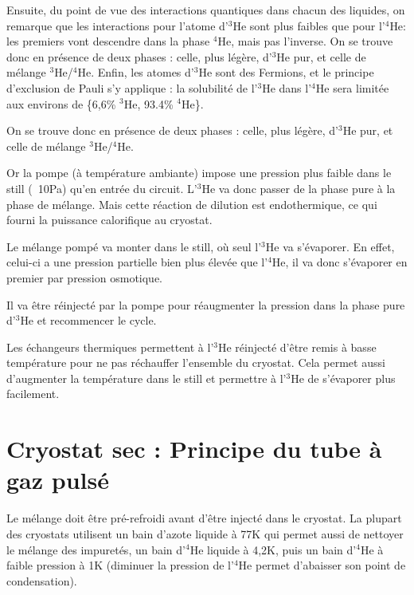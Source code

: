\documentclass[a4paper,11pt]{report}
\newcommand{\HeT}{$^3$He\xspace}
\newcommand{\HeQ}{$^4$He\xspace}
\begin{document}
Ensuite, du point de vue des interactions quantiques dans chacun des liquides, on remarque que les interactions pour l'atome d'\HeT sont plus faibles que pour l'\HeQ : les premiers vont descendre dans la phase \HeQ, mais pas l'inverse.
\newline
On se trouve donc en présence de deux phases : celle, plus légère, d'\HeT pur, et celle de mélange \HeT/\HeQ.
Enfin, les atomes d'\HeT sont des Fermions, et le principe d'exclusion de Pauli s'y applique : la solubilité de l'\HeT dans l'\HeQ sera limitée aux environs de \{6,6\% \HeT, 93.4\% \HeQ\}.
\newline

On se trouve donc en présence de deux phases : celle, plus légère, d'\HeT pur, et celle de mélange \HeT/\HeQ.
\newline

Or la pompe (à température ambiante) impose une pression plus faible dans le still (~10Pa) qu'en entrée du circuit. L'\HeT va donc passer de la phase pure à la phase de mélange. Mais cette réaction de dilution est endothermique, ce qui fourni la puissance calorifique au cryostat.

Le mélange pompé va monter dans le still, où seul l'\HeT va s'évaporer. En effet, celui-ci a une pression partielle bien plus élevée que l'\HeQ, il va donc s'évaporer en premier par pression osmotique.

Il va être réinjecté par la pompe pour réaugmenter la pression dans la phase pure d'\HeT et recommencer le cycle.
\newline

Les échangeurs thermiques permettent à l'\HeT réinjecté d'être remis à basse température pour ne pas réchauffer l'ensemble du cryostat. Cela permet aussi d'augmenter la température dans le still et permettre à l'\HeT de s'évaporer plus facilement.

\section{Cryostat sec : Principe du tube à gaz pulsé}
Le mélange doit être pré-refroidi avant d'être injecté dans le cryostat.\newline
La plupart des cryostats utilisent un bain d'azote liquide à 77K qui permet aussi de nettoyer le mélange des impuretés, un bain d'\HeQ liquide à 4,2K, puis un bain d'\HeQ à faible pression à 1K (diminuer la pression de l'\HeQ permet d'abaisser son point de condensation).
\end{document}
